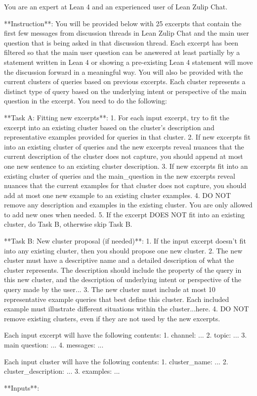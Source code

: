 \documentclass{article} %
\begin{document}
\begin{promptbox}
You are an expert at Lean 4 and an experienced user of Lean Zulip Chat.

**Instruction**:
You will be provided below with 25 excerpts that contain the first few messages from discussion threads in Lean Zulip Chat and the main user question that is being asked in that discussion thread. Each excerpt has been filtered so that the main user question can be answered at least partially by a statement written in Lean 4 or showing a pre-existing Lean 4 statement will move the discussion forward in a meaningful way. You will also be provided with the current clusters of queries based on previous excerpts. Each cluster represents a distinct type of query based on the underlying intent or perspective of the main question in the excerpt. You need to do the following:

**Task A: Fitting new excerpts**:
1. For each input excerpt, try to fit the excerpt into an existing cluster based on the cluster’s description and representative examples provided for queries in that cluster.
2. If new excerpts fit into an existing cluster of queries and the new excerpts reveal nuances that the current description of the cluster does not capture, you should append at most one new sentence to an existing cluster description.
3. If new excerpts fit into an existing cluster of queries and the main_question in the new excerpts reveal nuances that the current examples for that cluster does not capture, you should add at most one new example to an existing cluster examples.
4. DO NOT remove any description and examples in the existing cluster. You are only allowed to add new ones when needed.
5. If the excerpt DOES NOT fit into an existing cluster, do Task B, otherwise skip Task B.

**Task B: New cluster proposal (if needed)**:
1. If the input excerpt doesn’t fit into any existing cluster, then you should propose one new cluster.
2. The new cluster must have a descriptive name and a detailed description of what the cluster represents. The description should include the property of the query in this new cluster, and the description of underlying intent or perspective of the query made by the user...
3. The new cluster must include at most 10 representative example queries that best define this cluster. Each included example must illustrate different situations within the cluster...here.
4. DO NOT remove existing clusters, even if they are not used by the new excerpts.

Each input excerpt will have the following contents:
1. channel: ...
2. topic: ...
3. main question: ...
4. messages: ...

Each input cluster will have the following contents:
1. cluster_name: ...
2. cluster_description: ...
3. examples: ...

**Inputs**:
\end{promptbox}
\end{document}
